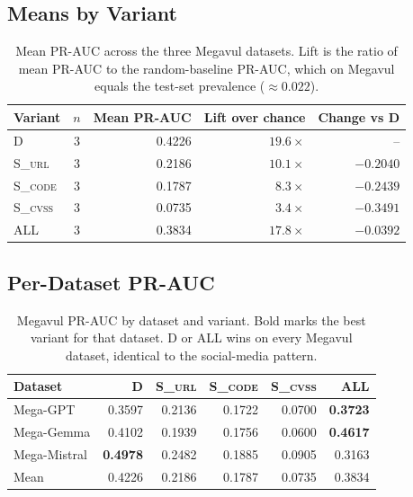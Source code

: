 \documentclass[11pt]{article}
\begin{document}
\subsection{Means by Variant}

\begin{table}[h]
\centering
\small
\begin{tabular}{lcrrr}
\toprule
Variant & $n$ & Mean PR-AUC & Lift over chance & Change vs \textsc{D} \\
\midrule
\textsc{D}      & 3 & 0.4226 & $19.6\times$ & --       \\
\textsc{S\_url} & 3 & 0.2186 & $10.1\times$ & $-0.2040$ \\
\textsc{S\_code}& 3 & 0.1787 & $\phantom{0}8.3\times$ & $-0.2439$ \\
\textsc{S\_cvss}& 3 & 0.0735 & $\phantom{0}3.4\times$ & $-0.3491$ \\
\textsc{ALL}    & 3 & 0.3834 & $17.8\times$ & $-0.0392$ \\
\bottomrule
\end{tabular}
\caption{Mean PR-AUC across the three Megavul datasets. Lift is the
ratio of mean PR-AUC to the random-baseline PR-AUC, which on Megavul
equals the test-set prevalence ($\approx 0.022$).}
\end{table}

\subsection{Per-Dataset PR-AUC}

\begin{table}[h]
\centering
\small
\begin{tabular}{lrrrrr}
\toprule
Dataset & \textsc{D} & \textsc{S\_url} & \textsc{S\_code} & \textsc{S\_cvss} & \textsc{ALL} \\
\midrule
Mega-GPT     & 0.3597 & 0.2136 & 0.1722 & 0.0700 & \textbf{0.3723} \\
Mega-Gemma   & 0.4102 & 0.1939 & 0.1756 & 0.0600 & \textbf{0.4617} \\
Mega-Mistral & \textbf{0.4978} & 0.2482 & 0.1885 & 0.0905 & 0.3163 \\
\midrule
Mean         & 0.4226 & 0.2186 & 0.1787 & 0.0735 & 0.3834 \\
\bottomrule
\end{tabular}
\caption{Megavul PR-AUC by dataset and variant. Bold marks the best
variant for that dataset. \textsc{D} or \textsc{ALL} wins on every
Megavul dataset, identical to the social-media pattern.}
\end{table}
\end{document}
